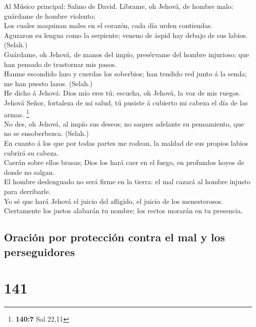  Al Músico principal: Salmo de David. Líbrame, oh Jehová,
de hombre malo: guárdame de hombre violento;\\
 Los cuales maquinan males en el corazón, cada día urden
contiendas.\\
 Aguzaron su lengua como la serpiente; veneno de áspid hay
debajo de sus labios. (Selah.)\\
 Guárdame, oh Jehová, de manos del impío, presérvame del
hombre injurioso; que han pensado de trastornar mis pasos.\\
 Hanme escondido lazo y cuerdas los soberbios; han tendido
red junto á la senda; me han puesto lazos. (Selah.)\\
 He dicho á Jehová: Dios mío eres tú; escucha, oh Jehová,
la voz de mis ruegos.\\
 Jehová Señor, fortaleza de mi salud, tú pusiste á
cubierto mi cabeza el día de las armas. \footnote{\textbf{140:7} Sal
  22,11}\\
 No des, oh Jehová, al impío sus deseos; no saques
adelante su pensamiento, que no se ensoberbezca. (Selah.)\\
 En cuanto á los que por todas partes me rodean, la maldad
de sus propios labios cubrirá su cabeza.\\
 Caerán sobre ellos brasas; Dios los hará caer en el
fuego, en profundos hoyos de donde no salgan.\\
 El hombre deslenguado no será firme en la tierra: el mal
cazará al hombre injusto para derribarle.\\
 Yo sé que hará Jehová el juicio del afligido, el juicio
de los menesterosos.\\
 Ciertamente los justos alabarán tu nombre; los rectos
morarán en tu presencia.

\hypertarget{oraciuxf3n-por-protecciuxf3n-contra-el-mal-y-los-perseguidores}{%
\subsection{Oración por protección contra el mal y los
perseguidores}\label{oraciuxf3n-por-protecciuxf3n-contra-el-mal-y-los-perseguidores}}

\hypertarget{section-140}{%
\section{141}\label{section-140}}

